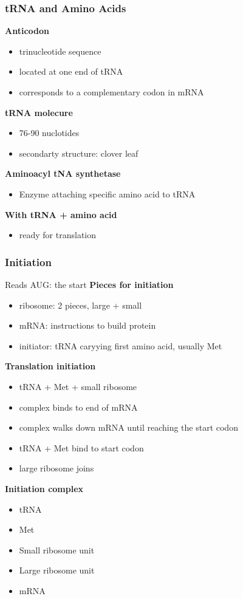 \documentclass[11pt,fleqn]{book} %
\begin{document}
\subsubsection{tRNA and Amino Acids}
\textbf{Anticodon}
\begin{itemize}
    \item trinucleotide sequence
    \item located at one end of tRNA
    \item corresponds to a complementary codon in mRNA
\end{itemize}
\textbf{tRNA molecure}
\begin{itemize}
    \item 76-90 nuclotides
    \item secondarty structure: clover leaf
\end{itemize}
\textbf{Aminoacyl tNA synthetase}
\begin{itemize}
    \item Enzyme attaching specific amino acid to tRNA
\end{itemize}
\textbf{With tRNA + amino acid}
\begin{itemize}
    \item ready for translation
\end{itemize}
\subsubsection{Initiation}
Reads AUG: the start
\textbf{Pieces for initiation}
\begin{itemize}
    \item ribosome: 2 pieces, large + small
    \item mRNA: instructions to build protein
    \item initiator: tRNA caryying first amino acid, usually Met
\end{itemize}
\textbf{Translation initiation}
\begin{itemize}
    \item tRNA + Met + small ribosome
    \item complex binds to end of mRNA
    \item complex walks down mRNA until reaching the start codon
    \item tRNA + Met bind to start codon
    \item large ribosome joins
\end{itemize}
\textbf{Initiation complex}
\begin{itemize}
    \item tRNA
    \item Met
    \item Small ribosome unit
    \item Large ribosome unit
    \item mRNA
\end{itemize}
\end{document}
